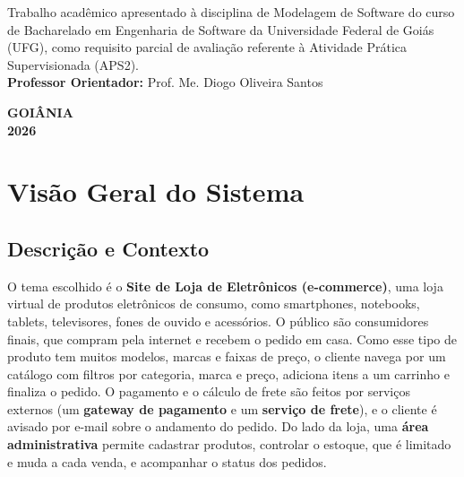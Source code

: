 \documentclass[12pt,a4paper]{article}
\begin{document}
\vspace{2.5cm}
\begin{flushright}
  \begin{minipage}{0.52\textwidth}
    \begin{singlespace}
      {\small Trabalho acadêmico apresentado à disciplina de Modelagem
      de Software do curso de Bacharelado em Engenharia de Software da
      Universidade Federal de Goiás (UFG), como requisito parcial de
      avaliação referente à Atividade Prática Supervisionada (APS2).\\[0.4cm]
      \textbf{Professor Orientador:} Prof. Me. Diogo Oliveira Santos}
    \end{singlespace}
  \end{minipage}
\end{flushright}

\vfill
\begin{center}
  \textbf{GOIÂNIA}\\[0.2cm]
  \textbf{2026}
\end{center}
\newpage

\thispagestyle{empty}
\renewcommand{\contentsname}{SUMÁRIO}
\pdfbookmark[0]{\contentsname}{toc}
\tableofcontents
\thispagestyle{empty}
\newpage

\pagestyle{fancy}
\thispagestyle{fancy}

\section{Visão Geral do Sistema}\label{sec:visao}

\subsection{Descrição e Contexto}

O tema escolhido é o \textbf{Site de Loja de Eletrônicos (e-commerce)}, uma
loja virtual de produtos eletrônicos de consumo, como smartphones, notebooks,
tablets, televisores, fones de ouvido e acessórios. O público são consumidores
finais, que compram pela internet e recebem o pedido em casa. Como esse tipo de
produto tem muitos modelos, marcas e faixas de preço, o cliente navega por um
catálogo com filtros por categoria, marca e preço, adiciona itens a um
carrinho e finaliza o pedido. O pagamento e o cálculo de frete são feitos por
serviços externos (um \textbf{gateway de pagamento} e um \textbf{serviço de
frete}), e o cliente é avisado por e-mail sobre o andamento do pedido. Do lado
da loja, uma \textbf{área administrativa} permite cadastrar produtos, controlar
o estoque, que é limitado e muda a cada venda, e acompanhar o status dos
pedidos.
\end{document}
